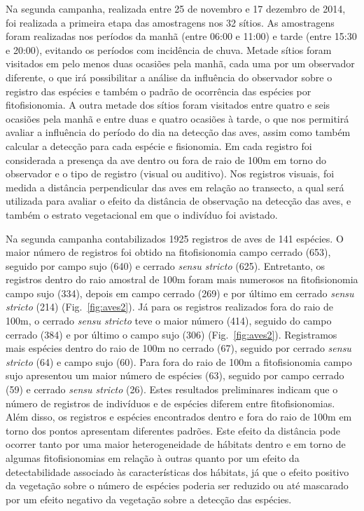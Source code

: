 Na segunda campanha, realizada entre 25 de novembro e 17 dezembro de
2014, foi realizada a primeira etapa das amostragens nos 32 sítios. 
As amostragens foram realizadas nos períodos da manhã (entre 06:00 e
11:00) e tarde (entre 15:30 e 20:00), evitando os períodos com
incidência de chuva. Metade sítios foram visitados em
pelo menos duas ocasiões pela manhã, cada uma por um observador
diferente, o que irá possibilitar a análise da influência do
observador sobre o registro das espécies e também o
padrão de ocorrência das espécies por fitofisionomia. A outra metade
dos sítios foram visitados entre quatro e seis ocasiões pela manhã e
entre duas e quatro ocasiões à tarde, o que nos permitirá avaliar a
influência do período do dia na detecção das aves, assim como também
calcular a detecção para cada espécie e fisionomia. Em cada registro
foi considerada a presença da ave dentro ou fora de raio de 100m em torno do observador
e o tipo de registro (visual ou auditivo). Nos registros visuais, foi
medida a distância perpendicular das aves em relação ao
transecto, a qual será utilizada para avaliar o efeito da distância de
observação na detecção das aves, e também o estrato vegetacional em que o
indivíduo foi avistado. 

Na segunda campanha
contabilizados 1925 registros de aves de 141 espécies.
O maior número de
registros foi obtido na fitofisionomia campo cerrado (653), seguido
por campo sujo (640) e cerrado \textit{sensu stricto}
(625). Entretanto, os
registros dentro do raio amostral de 100m foram mais numerosos na
fitofisionomia campo sujo (334), depois em campo cerrado (269) e por
último em cerrado \textit{sensu stricto} (214) (Fig.~\ref{fig:aves2}). 
Já para os
registros realizados fora do raio de 100m,
o cerrado \textit{sensu stricto} teve o maior número (414), 
seguido do campo cerrado (384) e
por último o campo sujo (306) (Fig.~\ref{fig:aves2}). 
Registramos mais espécies dentro do raio de 100m no
cerrado (67), seguido por cerrado \textit{sensu stricto} (64) e campo
sujo (60). Para fora do raio de 100m 
a fitofisionomia campo sujo apresentou um maior número de espécies (63), seguido por campo
cerrado (59) e cerrado \textit{sensu stricto} (26).
Estes resultados preliminares indicam que o número de registros de indivíduos e de espécies
diferem entre fitofisionomias. Além disso, 
os registros e espécies encontrados dentro e fora do raio de 100m
em torno dos pontos apresentam diferentes padrões. Este efeito da
distância pode ocorrer tanto por uma maior heterogeneidade de hábitats
dentro e em torno de algumas fitofisionomias em relação à outras quanto por um
efeito da detectabilidade associado às características dos hábitats,
já que o efeito positivo da vegetação sobre o número de espécies
poderia ser reduzido ou até mascarado por um efeito negativo da
vegetação sobre a detecção das espécies.

